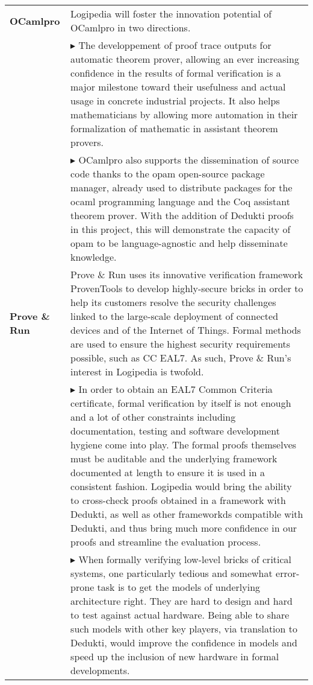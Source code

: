 \begin{longtable}{|p{}|p{}|}
\hline

{\bf OCamlpro} &

Logipedia will foster the innovation
potential of OCamlpro in two directions.\\

&
$\blacktriangleright$
The developpement of proof trace
outputs for automatic theorem prover, allowing an ever increasing
confidence in the results of formal verification is a major milestone
toward their usefulness and actual usage in concrete industrial
projects. It also helps mathematicians by allowing more automation in
their formalization of mathematic in assistant theorem provers.
\\

&
$\blacktriangleright$
OCamlpro also supports the dissemination of source code thanks to
the opam open-source package manager, already used to distribute packages
for the ocaml programming language and the Coq assistant theorem prover.
With the addition of Dedukti proofs in this project, this will demonstrate
the capacity of opam to be language-agnostic and help disseminate knowledge.
\\

\hline
{\bf Prove \& Run} &

Prove \& Run uses its innovative verification framework ProvenTools
to develop highly-secure bricks in order to help its customers resolve
the security challenges linked to the large-scale deployment of
connected devices and of the Internet of Things. Formal methods
are used to ensure the highest security requirements possible, such
as CC EAL7. As such, Prove \& Run's interest in Logipedia is
twofold.\\

&
$\blacktriangleright$
In order to obtain an EAL7 Common Criteria certificate, formal
verification by itself is not enough and a lot of other constraints
including documentation, testing and software development hygiene come
into play. The formal proofs themselves must be auditable and the underlying
framework documented at length to ensure it is used in a consistent fashion.
Logipedia would bring the ability to cross-check proofs obtained in a
framework with Dedukti, as well as other frameworkds compatible with
Dedukti, and thus bring much more confidence in our proofs and streamline
the evaluation process.\\

&
$\blacktriangleright$
When formally verifying low-level bricks of critical systems, one
particularly tedious and somewhat error-prone task is to get the models
of underlying architecture right. They are hard to design and hard to
test against actual hardware. Being able to share such models with
other key players, via translation to Dedukti, would improve the confidence
in models and speed up the inclusion of new hardware in formal developments.\\
    

\end{longtable}
